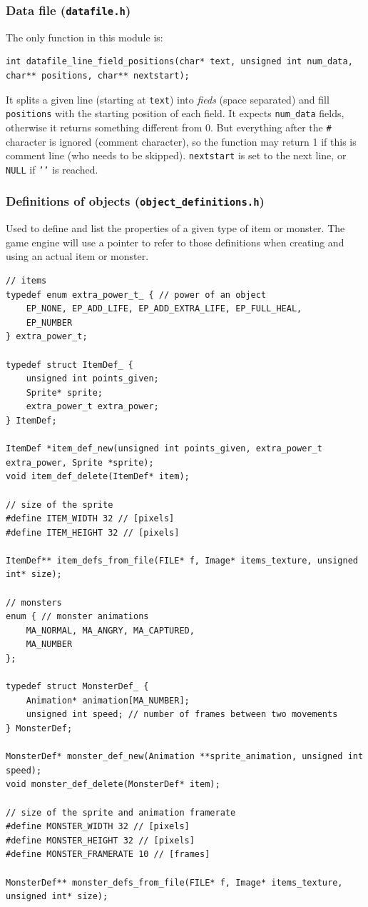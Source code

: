 \documentclass[12pt,a4paper]{article}
\newcommand{\cc}[1]{\texttt{#1}}
\begin{document}
\subsubsection{Data file (\texttt{datafile.h})}

The only function in this module is:\begin{verbatim}
int datafile_line_field_positions(char* text, unsigned int num_data, char** positions, char** nextstart);
\end{verbatim}

It splits a given line (starting at \cc{text}) into \textit{fieds} (space separated) and fill \cc{positions} with the starting position of each field. It expects \cc{num_data} fields, otherwise it returns something different from 0. But everything after the \texttt{\#} character is ignored (comment character), so the function may return 1 if this is comment line (who needs to be skipped). \cc{nextstart} is set to the next line, or \cc{NULL} if \cc{'\0'} is reached.

\subsubsection{Definitions of objects (\texttt{object\_definitions.h})}

Used to define and list the properties of a given type of item or monster. The game engine will use a pointer to refer to those definitions when creating and using an actual item or monster.

\begin{verbatim}
// items
typedef enum extra_power_t_ { // power of an object
	EP_NONE, EP_ADD_LIFE, EP_ADD_EXTRA_LIFE, EP_FULL_HEAL,
	EP_NUMBER
} extra_power_t;

typedef struct ItemDef_ {
	unsigned int points_given;
	Sprite* sprite;
	extra_power_t extra_power;
} ItemDef;

ItemDef *item_def_new(unsigned int points_given, extra_power_t extra_power, Sprite *sprite);
void item_def_delete(ItemDef* item);

// size of the sprite
#define ITEM_WIDTH 32 // [pixels]
#define ITEM_HEIGHT 32 // [pixels]

ItemDef** item_defs_from_file(FILE* f, Image* items_texture, unsigned int* size);

// monsters
enum { // monster animations
    MA_NORMAL, MA_ANGRY, MA_CAPTURED,
    MA_NUMBER
};

typedef struct MonsterDef_ {
	Animation* animation[MA_NUMBER];
	unsigned int speed; // number of frames between two movements
} MonsterDef;

MonsterDef* monster_def_new(Animation **sprite_animation, unsigned int speed);
void monster_def_delete(MonsterDef* item);

// size of the sprite and animation framerate
#define MONSTER_WIDTH 32 // [pixels]
#define MONSTER_HEIGHT 32 // [pixels]
#define MONSTER_FRAMERATE 10 // [frames]

MonsterDef** monster_defs_from_file(FILE* f, Image* items_texture, unsigned int* size);
\end{verbatim}
\end{document}
